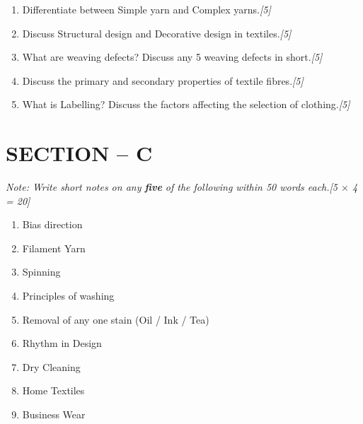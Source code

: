 \documentclass[11pt,a4paper]{article}
\newcommand{\pts}[1]{\hfill \textit{[#1]}}
\begin{document}
\begin{enumerate}[label=\textbf{\arabic*.},leftmargin=*,start=5,itemsep=8pt]

  \item Differentiate between Simple yarn and Complex yarns.\pts{5}

  \item Discuss Structural design and Decorative design in textiles.\pts{5}

  \item What are weaving defects? Discuss any 5 weaving defects in short.\pts{5}

  \item Discuss the primary and secondary properties of textile fibres.\pts{5}

  \item What is Labelling? Discuss the factors affecting the selection of clothing.\pts{5}

\end{enumerate}

\bigskip

\section*{SECTION -- C}
\noindent \textit{Note: Write short notes on any \textbf{five} of the following within 50 words each.}\pts{5 $\times$ 4 = 20}

\begin{enumerate}[label=\roman*.,leftmargin=*,itemsep=6pt]

  \item Bias direction
  \item Filament Yarn
  \item Spinning
  \item Principles of washing
  \item Removal of any one stain (Oil / Ink / Tea)
  \item Rhythm in Design
  \item Dry Cleaning
  \item Home Textiles
  \item Business Wear

\end{enumerate}
\end{document}
